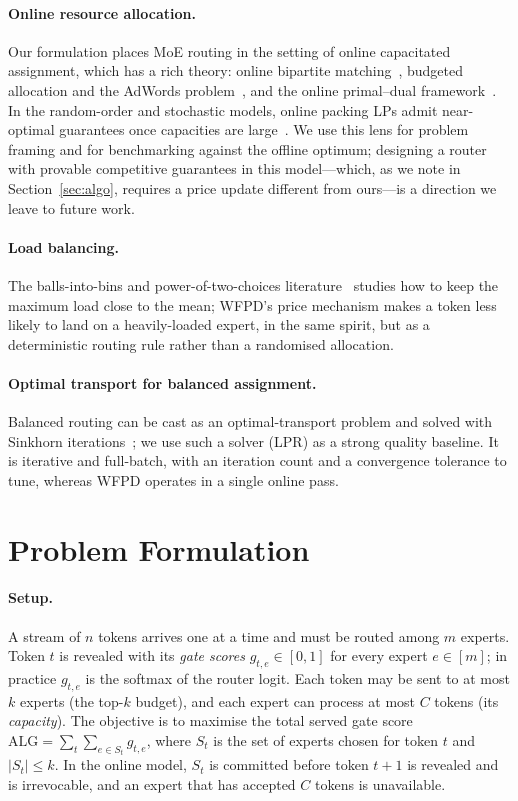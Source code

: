 \documentclass[preprint,12pt]{elsarticle}
\theoremstyle{plain}
\theoremstyle{remark}
\newcommand{\alg}{\mathrm{ALG}}
\begin{document}
\paragraph{Online resource allocation.}
Our formulation places MoE routing in the setting of online capacitated
assignment, which has a rich theory: online bipartite
matching~\cite{kvv}, budgeted allocation and the AdWords
problem~\cite{adwords}, and the online primal--dual
framework~\cite{buchbinder}. In the random-order and stochastic models,
online packing LPs admit near-optimal guarantees once capacities are
large~\cite{devanurhayes,awy,krtv,blm}. We use this lens for problem
framing and for benchmarking against the offline optimum; designing a
router with provable competitive guarantees in this model---which, as we
note in Section~\ref{sec:algo}, requires a price update different from
ours---is a direction we leave to future work.

\paragraph{Load balancing.}
The balls-into-bins and power-of-two-choices
literature~\cite{twochoices,mitzenmacher} studies how to keep the maximum
load close to the mean; WFPD's price mechanism makes a token less likely to
land on a heavily-loaded expert, in the same spirit, but as a deterministic
routing rule rather than a randomised allocation.

\paragraph{Optimal transport for balanced assignment.}
Balanced routing can be cast as an optimal-transport problem and solved with
Sinkhorn iterations~\cite{sinkhorn}; we use such a solver (\textsc{LPR}) as
a strong quality baseline. It is iterative and full-batch, with an iteration
count and a convergence tolerance to tune, whereas WFPD operates in a single
online pass.

\section{Problem Formulation}
\label{sec:problem}

\paragraph{Setup.}
A stream of $n$ tokens arrives one at a time and must be routed among $m$
experts. Token $t$ is revealed with its \emph{gate scores}
$g_{t,e}\in[0,1]$ for every expert $e\in[m]$; in practice $g_{t,e}$ is the
softmax of the router logit. Each token may be sent to at most $k$ experts
(the top-$k$ budget), and each expert can process at most $C$ tokens (its
\emph{capacity}). The objective is to maximise the total served gate score
$\alg=\sum_{t}\sum_{e\in S_t} g_{t,e}$, where $S_t$ is the set of experts
chosen for token $t$ and $|S_t|\le k$. In the online model, $S_t$ is
committed before token $t+1$ is revealed and is irrevocable, and an expert
that has accepted $C$ tokens is unavailable.
\end{document}
